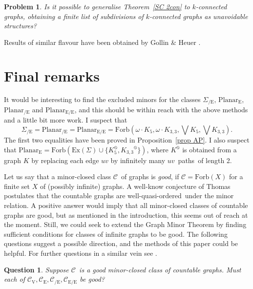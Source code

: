 \documentclass{article}
\newcommand{\forb}[1]{\mathrm{Forb}(#1)}
\newcommand{\ex}[1]{\mathrm{Ex}(#1)}
\newcommand{\prl}[1]{#1^{\obslash}}
\newcommand{\rmv}[1]{\ensuremath{#1_{\mathrm{V}}}}
\newcommand{\rme}[1]{\ensuremath{#1_{\mathrm{E}}}}
\newcommand{\rmce}[1]{\ensuremath{#1_{\mathrm{/E}}}}
\newcommand{\rmece}[1]{\ensuremath{#1_{\mathrm{E/E}}}}
\newcommand{\Sig}{\ensuremath{\Sigma}}
\newcommand{\omdot}{\omega \cdot}
\newcommand{\comment}[1]{}
\newcommand{\defi}[1]{{\color{darkgray}\emph{#1}}}
\newtheorem{problem}[conjecture]{{Problem}}
\newtheorem{question}[conjecture]{{Question}}
\newcommand{\cc}{\ensuremath{\mathcal C}}
\newcommand{\pths}[2]{\ensuremath{#1}\text{--}\ensuremath{#2}~paths}
\newcommand{\Ktt}{\ensuremath{K_{3,3}}}
\newcommand{\wqo}{well-quasi-ordered}
\newcommand{\Tr}[1]{Theorem~\ref{#1}}
\newcommand{\Prr}[1]{Pro\-position~\ref{#1}}
\begin{document}
\begin{problem} Is it possible to generalise \Tr{SC 2con} to $k$-connected graphs, obtaining a finite list of subdivisions of $k$-connected graphs as unavoidable structures?
\end{problem} 

Results of similar flavour have been obtained by Gollin \& Heuer \cite{GolHeuCha}.

\section{Final remarks} \label{final}

It would be interesting to find the excluded minors for the classes $\rmce{\Sig}$, $\rme{\mathrm{Planar}}$, $\rmce{\mathrm{Planar}}$ and $\rmece{\mathrm{Planar}}$, and this should be within reach with the above methods and a little bit more work. I suspect that $$\rmce{\Sig}= \rmce{\mathrm{Planar}} = \rmece{\mathrm{Planar}} =\forb{\omdot K_5, \omdot \Ktt, \bigvee K_5, \bigvee \Ktt}.$$ The first two equalities have been proved in \Prr{prop AP}. I also suspect that  
$\rme{\mathrm{Planar}}=\forb{ \ex{\Sig} \cup \{\prl{K_5}, \prl{\Ktt} \}}$, where $\prl{K}$ is obtained from a graph $K$ by replacing each edge $uv$ by infinitely many \pths{u}{v}\ of length 2.

\comment{
	\begin{question} \label{Q SigCE}
Is $\rmce{\Sig}=\forb{\omdot K_5, \omdot \Ktt, \bigvee K_5, \bigvee \Ktt}$?
\end{question}
}

\medskip

Let us say that a minor-closed class \cc\ of graphs is \defi{good}, if $\cc=\forb{X}$ for a finite set $X$ of (possibly infinite) graphs. A well-know conjecture of Thomas \cite{ThoWel} postulates that the countable graphs are \wqo\ under the minor relation. A positive answer would imply that all minor-closed classes of countable graphs are good, but as mentioned in the introduction, this seems out of reach at the moment.  Still, we could seek to extend the Graph Minor Theorem \cite{GMXX} by finding sufficient conditions for classes of infinite graphs to be good. The following questions suggest a possible direction, and the methods of this paper  could be helpful. For further questions in a similar vein see \cite{Universal}.


\begin{question} \label{Q good}
Suppose \cc\ is a good minor-closed class of countable graphs. Must each of $\rmv{\cc},\rme{\cc},\rmce{\cc},\rmece{\cc}$ be good?
\end{question}
\end{document}
